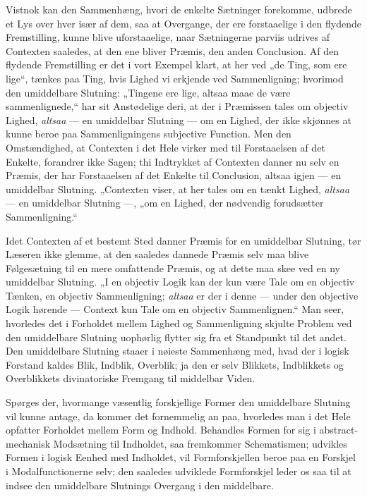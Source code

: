 \documentclass[12pt]{book}
\newcommand{\opage}[1]{\marginnote{\footnotesize\textit{[#1]}}}
\begin{document}
Vistnok kan den Sammenhæng, hvori de enkelte Sætninger
forekomme, udbrede et Lys over hver især af dem, saa
\opage{298}at Overgange, der ere forstaaelige i den flydende Fremstilling,
kunne blive uforstaaelige, naar Sætningerne parviis udrives
af Contexten saaledes, at den ene bliver Præmis, den anden
Conclusion. Af den flydende Fremstilling er det i vort Exempel
klart, at her ved „de Ting, som ere lige“, tænkes paa
Ting, hvis Lighed vi erkjende ved Sammenligning; hvorimod
den umiddelbare Slutning: „Tingene ere lige, altsaa maae de
være sammenlignede,“ har sit Anstødelige deri, at der i Præmissen
tales om objectiv Lighed, \emph{altsaa} --- en umiddelbar
Slutning --- om en Lighed, der ikke skjønnes at kunne beroe
paa Sammenligningens subjective Function. Men den
Omstændighed, at Contexten i det Hele virker med til Forstaaelsen
af det Enkelte, forandrer ikke Sagen; thi Indtrykket
af Contexten danner nu selv en Præmis, der har Forstaaelsen
af det Enkelte til Conclusion, altsaa igjen --- en umiddelbar
Slutning. „Contexten viser, at her tales om en tænkt
Lighed, \emph{altsaa} --- en umiddelbar Slutning ---, „om en Lighed,
der nødvendig forudsætter Sammenligning.“

Idet Contexten af et bestemt Sted danner Præmis for
en umiddelbar Slutning, tør Læseren ikke glemme, at den
saaledes dannede Præmis selv maa blive Følgesætning til en
mere omfattende Præmis, og at dette maa skee ved en ny
umiddelbar Slutning. „I en objectiv Logik kan der kun
være Tale om en objectiv Tænken, en objectiv Sammenligning;
\emph{altsaa} er der i denne --- under den objective Logik hørende ---
Context kun Tale om en objectiv Sammenlignen.“ Man
seer, hvorledes det i Forholdet mellem Lighed og Sammenligning
skjulte Problem ved den umiddelbare Slutning uophørlig
flytter sig fra et Standpunkt til det andet. Den umiddelbare
Slutning staaer i nøieste Sammenhæng med, hvad der
i logisk Forstand kaldes Blik, Indblik, Overblik; ja den er
selv Blikkets, Indblikkets og Overblikkets divinatoriske Fremgang
til middelbar Viden.

Spørges der, hvormange væsentlig forskjellige Former
\opage{299}den umiddelbare Slutning vil kunne antage, da kommer det
fornemmelig an paa, hvorledes man i det Hele opfatter Forholdet
mellem Form og Indhold. Behandles Formen for sig
i abstract-mechanisk Modsætning til Indholdet, saa fremkommer
Schematismen; udvikles Formen i logisk Eenhed med
Indholdet, vil Formforskjellen beroe paa en Forskjel i Modalfunctionerne
selv; den saaledes udviklede Formforskjel leder os
saa til at indsee den umiddelbare Slutnings Overgang i den
middelbare.
\end{document}
